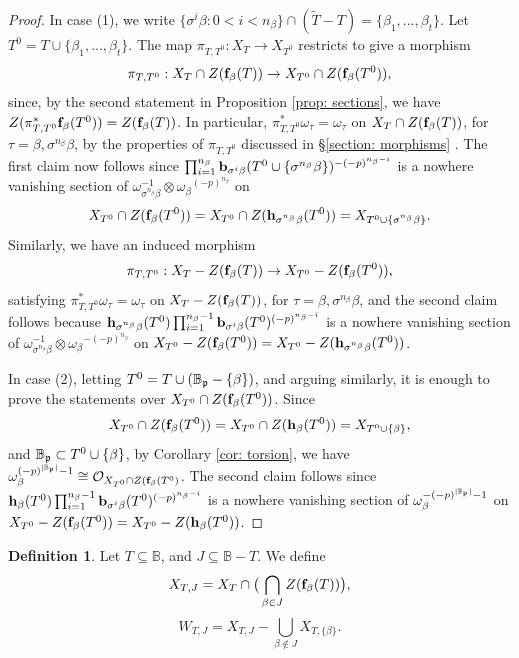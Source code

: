 \documentclass[11pt,pdflatex]{amsart}
\theoremstyle{plain}
\theoremstyle{definition}
\theoremstyle{plain}
\theoremstyle{definition}
\newtheorem{dfn}[theorem]{Definition}
\theoremstyle{remark}
\numberwithin{equation}{section}
\numberwithin{figure}{section} \numberwithin{table}{subsection}
\newcommand{\gerp}{{\frak{p}}}
\newcommand{\calO}{{\mathcal{O}}}
\def\BB{\mathbb{B}}
\begin{document}
\begin{proof} In case (1), we write $\{\sigma^i\beta: 0 < i < n_\beta\} \cap (\tilde{T}-T)=\{\beta_1,...,\beta_t\}$. Let $T^0=T\cup \{\beta_1,...,\beta_t\}$. The map $\pi_{T,T^0}: X_T \rightarrow X_{T^0}$ restricts to give a morphism $$\pi_{T,T^0}: X_T \cap Z({\bf f}_\beta(T))\rightarrow X_{T^0} \cap Z({\bf f}_\beta(T^0)),$$ 
since, by the second statement in Proposition \ref{prop: sections}, we have  $Z(\pi_{T,T^0}^*{\bf f}_\beta(T^0))=Z({\bf f}_\beta(T))$. In particular, $\pi_{T,T^0}^*\omega_{\tau}=\omega_\tau$ on $X_T \cap Z({\bf f}_\beta(T))$, for $\tau=\beta, \sigma^{n_\beta}\beta$, by the properties of $\pi_{T,T^0}$ discussed in \S \ref{section: morphisms} . The first claim now follows since $\prod_{i=1}^{n_\beta} {\bf b}_{\sigma^i\beta}(T^0\cup\{\sigma^{n_\beta}\beta\})^{-(-p)^{n_\beta-i}}$ is a nowhere vanishing section of $\omega_{\sigma^{n_\beta}\beta}^{-1}\otimes {\omega_\beta}^{(-p)^{n_\beta}}$ on $$X_{T^0} \cap Z({\bf f}_\beta(T^0))=X_{T^0} \cap Z({\bf h}_{\sigma^{n_\beta}\beta}(T^0))=X_{T^0\cup\{\sigma^{n_\beta}\beta\}}.$$ Similarly, we have an induced morphism $$\pi_{T,T^0}: X_T -Z({\bf f}_\beta(T))\rightarrow X_{T^0} - Z({\bf f}_\beta(T^0)),$$ satisfying $\pi_{T,T^0}^*\omega_{\tau}=\omega_\tau$ on $X_T - Z({\bf f}_\beta(T))$, for $\tau=\beta, \sigma^{n_\beta}\beta$, and the second claim follows because  ${\bf h}_{\sigma^{n_\beta}\beta}(T^0)\prod_{i=1}^{n_\beta-1} {\bf b}_{\sigma^i\beta}(T^0)^{(-p)^{n_\beta-i}}$ is a nowhere vanishing section of $\omega_{\sigma^{n_\beta}\beta}^{-1}\otimes {\omega_\beta}^{-(-p)^{n_\beta}}$ on $X_{T^0}-Z({\bf f}_\beta(T^0))=X_{T^0} - Z({\bf h}_{\sigma^{n_\beta}\beta}(T^0))$.

In case (2), letting $T^0=T \cup (\BB_\gerp-\{\beta\})$, and arguing similarly, it is enough to prove the statements over $X_{T^0} \cap Z({\bf f}_\beta(T^0))$. Since  $$X_{T^0} \cap Z({\bf f}_\beta(T^0))=X_{T^0} \cap Z({\bf h}_\beta(T^0))=X_{T^0 \cup \{\beta\}},$$ and $\BB_\gerp \subset T^0 \cup \{\beta\}$, by Corollary \ref{cor: torsion}, we have $\omega_\beta^{(-p)^{|\BB_\gerp|}-1}\cong\calO_{X_{T^0} \cap Z({\bf f}_\beta(T^0)}$. The second claim follows  since   ${\bf h}_{\beta}(T^0)\prod_{i=1}^{n_\beta-1} {\bf b}_{\sigma^i\beta}(T^0)^{(-p)^{n_\beta-i}}$  is a nowhere vanishing section of $\omega_\beta^{-(-p)^{|\BB_\gerp|}-1}$ on $X_{T^0} - Z({\bf f}_\beta(T^0))=X_{T^0}  -Z({\bf h}_\beta(T^0))$.
 
\end{proof} 


\begin{dfn} Let $T \subseteq \BB$, and $J \subseteq \BB-T$. We define $$X_{T,J}=X_T \cap \big(\bigcap_{\beta \in J} Z({\bf f}_\beta(T))\big),$$
$$W_{T,J}=X_{T,J}-{\bigcup}_{\beta \not \in J} X_{T,\{\beta\}}.$$ \end{dfn}
\end{document}
